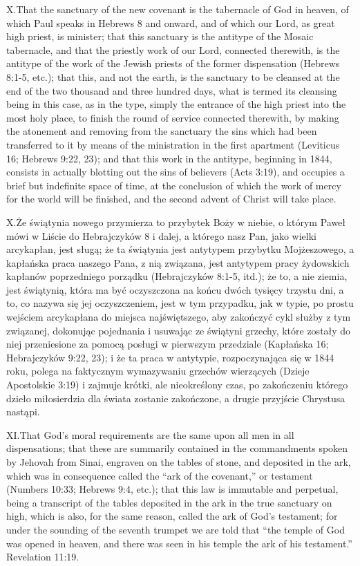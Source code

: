 \lettrine{X.} That the sanctuary of the new covenant is the tabernacle of God in heaven, of which Paul speaks in Hebrews 8 and onward, and of which our Lord, as great high priest, is minister; that this sanctuary is the antitype of the Mosaic tabernacle, and that the priestly work of our Lord, connected therewith, is the antitype of the work of the Jewish priests of the former dispensation (Hebrews 8:1-5, etc.); that this, and not the earth, is the sanctuary to be cleansed at the end of the two thousand and three hundred days, what is termed its cleansing being in this case, as in the type, simply the entrance of the high priest into the most holy place, to finish the round of service connected therewith, by making the atonement and removing from the sanctuary the sins which had been transferred to it by means of the ministration in the first apartment (Leviticus 16; Hebrews 9:22, 23); and that this work in the antitype, beginning in 1844, consists in actually blotting out the sins of believers (Acts 3:19), and occupies a brief but indefinite space of time, at the conclusion of which the work of mercy for the world will be finished, and the second advent of Christ will take place.


\lettrine{X.} Że świątynia nowego przymierza to przybytek Boży w niebie, o którym Paweł mówi w Liście do Hebrajczyków 8 i dalej, a którego nasz Pan, jako wielki arcykapłan, jest sługą; że ta świątynia jest antytypem przybytku Mojżeszowego, a kapłańska praca naszego Pana, z nią związana, jest antytypem pracy żydowskich kapłanów poprzedniego porządku (Hebrajczyków 8:1-5, itd.); że to, a nie ziemia, jest świątynią, która ma być oczyszczona na końcu dwóch tysięcy trzystu dni, a to, co nazywa się jej oczyszczeniem, jest w tym przypadku, jak w typie, po prostu wejściem arcykapłana do miejsca najświętszego, aby zakończyć cykl służby z tym związanej, dokonując pojednania i usuwając ze świątyni grzechy, które zostały do niej przeniesione za pomocą posługi w pierwszym przedziale (Kapłańska 16; Hebrajczyków 9:22, 23); i że ta praca w antytypie, rozpoczynająca się w 1844 roku, polega na faktycznym wymazywaniu grzechów wierzących (Dzieje Apostolskie 3:19) i zajmuje krótki, ale nieokreślony czas, po zakończeniu którego dzieło miłosierdzia dla świata zostanie zakończone, a drugie przyjście Chrystusa nastąpi.


\lettrine{XI.} That God’s moral requirements are the same upon all men in all dispensations; that these are summarily contained in the commandments spoken by Jehovah from Sinai, engraven on the tables of stone, and deposited in the ark, which was in consequence called the “ark of the covenant,” or testament (Numbers 10:33; Hebrews 9:4, etc.); that this law is immutable and perpetual, being a transcript of the tables deposited in the ark in the true sanctuary on high, which is also, for the same reason, called the ark of God’s testament; for under the sounding of the seventh trumpet we are told that “the temple of God was opened in heaven, and there was seen in his temple the ark of his testament.” Revelation 11:19.


